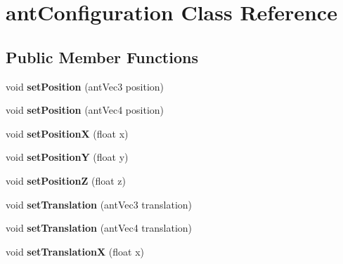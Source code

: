 \hypertarget{classant_configuration}{\section{ant\+Configuration Class Reference}
\label{classant_configuration}
}
\subsection*{Public Member Functions}
\begin{DoxyCompactItemize}
\item 
\hypertarget{classant_configuration_a078e7f6338cae58eaffdfd6a1dd3268f}{void {\bfseries set\+Position} (ant\+Vec3 position)}\label{classant_configuration_a078e7f6338cae58eaffdfd6a1dd3268f}

\item 
\hypertarget{classant_configuration_a737bd8e002968b83b13900966f5847e8}{void {\bfseries set\+Position} (ant\+Vec4 position)}\label{classant_configuration_a737bd8e002968b83b13900966f5847e8}

\item 
\hypertarget{classant_configuration_a2996c2dbb47d3725458e40bad1cd7e26}{void {\bfseries set\+Position\+X} (float x)}\label{classant_configuration_a2996c2dbb47d3725458e40bad1cd7e26}

\item 
\hypertarget{classant_configuration_a5d8fde3eb1d058f4a1f8f275fd5accca}{void {\bfseries set\+Position\+Y} (float y)}\label{classant_configuration_a5d8fde3eb1d058f4a1f8f275fd5accca}

\item 
\hypertarget{classant_configuration_ae47c87fe0b2e3aeb30163a9261210cb8}{void {\bfseries set\+Position\+Z} (float z)}\label{classant_configuration_ae47c87fe0b2e3aeb30163a9261210cb8}

\item 
\hypertarget{classant_configuration_afae8fc49b1cce2702b0ea520c621d7c8}{void {\bfseries set\+Translation} (ant\+Vec3 translation)}\label{classant_configuration_afae8fc49b1cce2702b0ea520c621d7c8}

\item 
\hypertarget{classant_configuration_ac9b3409d92b3c745cf8abb1fba672ab1}{void {\bfseries set\+Translation} (ant\+Vec4 translation)}\label{classant_configuration_ac9b3409d92b3c745cf8abb1fba672ab1}

\item 
\hypertarget{classant_configuration_a753f4f8d6ff54d6492e1dfcc3606f1eb}{void {\bfseries set\+Translation\+X} (float x)}\label{classant_configuration_a753f4f8d6ff54d6492e1dfcc3606f1eb}


\end{DoxyCompactItemize}
